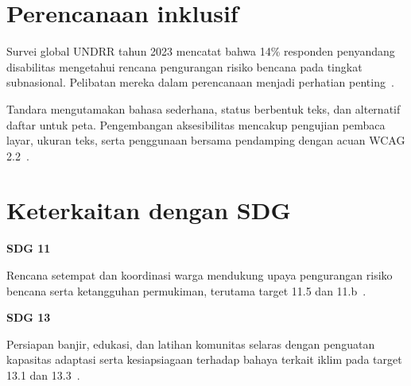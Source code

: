 \documentclass[10pt,a4paper]{article}
\begin{document}
\begin{minipage}[t]{.48\linewidth}\vspace{0pt}\raggedright
\section*{Perencanaan inklusif}
Survei global UNDRR tahun 2023 mencatat bahwa 14\% responden penyandang disabilitas mengetahui rencana pengurangan risiko bencana pada tingkat subnasional. Pelibatan mereka dalam perencanaan menjadi perhatian penting~\cite{undrr2023}.

Tandara mengutamakan bahasa sederhana, status berbentuk teks, dan alternatif daftar untuk peta. Pengembangan aksesibilitas mencakup pengujian pembaca layar, ukuran teks, serta penggunaan bersama pendamping dengan acuan WCAG 2.2~\cite{wcag}.
\end{minipage}\hfill
\begin{minipage}[t]{.48\linewidth}\vspace{0pt}\raggedright
\section*{Keterkaitan dengan SDG}
\textbf{SDG 11}\par
Rencana setempat dan koordinasi warga mendukung upaya pengurangan risiko bencana serta ketangguhan permukiman, terutama target 11.5 dan 11.b~\cite{sdg11}.

\textbf{SDG 13}\par
Persiapan banjir, edukasi, dan latihan komunitas selaras dengan penguatan kapasitas adaptasi serta kesiapsiagaan terhadap bahaya terkait iklim pada target 13.1 dan 13.3~\cite{sdg13}.
\end{minipage}

\newpage

\begin{center}\end{center}
\end{document}
